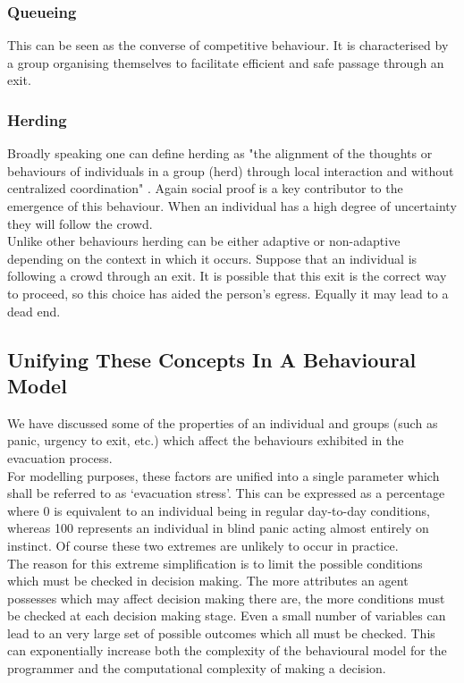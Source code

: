 \subsubsection{Queueing}
\label{Res:subsubsec:queueing}
This can be seen as the converse of competitive behaviour. It is characterised by a group organising themselves to facilitate efficient and safe passage through an exit.
\subsubsection{Herding}
\label{Res:subsubsec:herding}
Broadly speaking one can define herding as "the alignment of the thoughts or behaviours of individuals in a group (herd) through local interaction and without centralized coordination" \cite{HerdingInHumans}. Again social proof is a key contributor to the emergence of this behaviour. When an individual has a high degree of uncertainty they will follow the crowd.\\
Unlike other behaviours herding can be either adaptive or non-adaptive depending on the context in which it occurs. Suppose that an individual is following a crowd through an exit. It is possible that this exit is the correct way to proceed, so this choice has aided the person's egress. Equally it may lead to a dead end.

\subsection{Unifying These Concepts In A Behavioural Model}
\label{Res:subsec:unifyingParameters}
We have discussed some of the properties of an individual and groups (such as panic, urgency to exit, etc.) which affect the behaviours exhibited in the evacuation process.\\
For modelling purposes, these factors are unified into a single parameter which shall be referred to as `evacuation stress'. This can be expressed as a percentage where 0 is equivalent to an individual being in regular day-to-day conditions, whereas 100 represents an individual in blind panic acting almost entirely on instinct. Of course these two extremes are unlikely to occur in practice.\\
The reason for this extreme simplification is to limit the possible conditions which must be checked in decision making. The more attributes an agent possesses which may affect decision making there are, the more conditions must be checked at each decision making stage. Even a small number of variables can lead to an very large set of possible outcomes which all must be checked. This can exponentially increase both the complexity of the behavioural model for the programmer and the computational complexity of making a decision.

